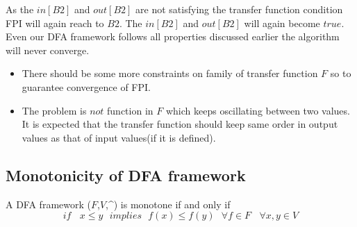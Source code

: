 As the $in[B2]$ and $out[B2]$ are not satisfying the transfer function condition FPI will again reach to $B2$. The $in[B2]$ and $out[B2]$ will again become $true$. Even our DFA framework follows all properties discussed earlier the algorithm will never converge. 
\begin{itemize}
    \item There should be some more constraints on family of transfer function $F$ so to guarantee convergence of FPI.  
    \item The problem is $not$ function in $F$ which keeps oscillating between two values. It is expected that the transfer function should keep same order in output values as that of input values(if it is defined).  
\end{itemize}
\subsection{Monotonicity of DFA framework}
A DFA framework ($F$,$V$,\^{}) is monotone if and only if
\[if \ \ \ \ x \leq y \ \ \ implies \ \ \ f(x) \leq f(y) \ \ \ \forall f \in F \ \ \ \ \forall x,y \in V\]
